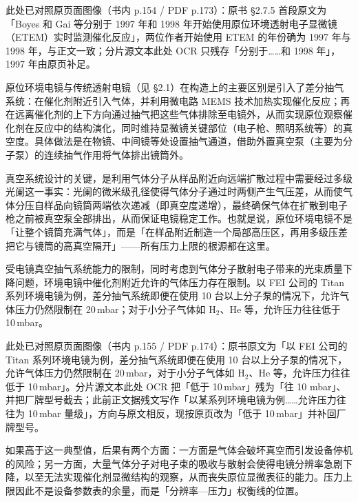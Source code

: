 此处已对照原页面图像（书内 p.154 / PDF p.173）：原书 \S 2.7.5 首段原文为「Boyes 和 Gai 等分别于 1997 年和 1998 年开始使用原位环境透射电子显微镜（ETEM）实时监测催化反应」，两位作者开始使用 ETEM 的年份确为 1997 年与 1998 年，与正文一致；分片源文本此处 OCR 只残存「分别于……和 1998 年」，1997 年由原页补足。

\begin{principle}
原位环境电镜与传统透射电镜（见 \S 2.1）在构造上的主要区别是引入了差分抽气系统：在催化剂附近引入气体，并利用微电路 MEMS 技术加热实现催化反应；再在远离催化剂的上下方向通过抽气把这些气体排除至电镜外，从而实现原位观察催化剂在反应中的结构演化，同时维持显微镜关键部位（电子枪、照明系统等）的真空度。具体做法是在物镜、中间镜等处设置抽气通道，借助外置真空泵（主要为分子泵）的连续抽气作用将气体排出镜筒外。

真空系统设计的关键，是利用气体分子从样品附近向远端扩散过程中需要经过多级光阑这一事实：光阑的微米级孔径使得气体分子通过时两侧产生气压差，从而使气体分压自样品向镜筒两端依次递减（即真空度递增），最终确保气体在扩散到电子枪之前被真空泵全部排出，从而保证电镜稳定工作。也就是说，原位环境电镜不是「让整个镜筒充满气体」，而是「在样品附近制造一个局部高压区，再用多级压差把它与镜筒的高真空隔开」——所有压力上限的根源都在这里。
\end{principle}

\begin{measure}
受电镜真空抽气系统能力的限制，同时考虑到气体分子散射电子带来的光束质量下降问题，环境电镜中催化剂附近允许的气体压力存在限制。以 FEI 公司的 Titan 系列环境电镜为例，差分抽气系统即便在使用 10 台以上分子泵的情况下，允许气体压力仍然限制在 20\,mbar；对于小分子气体如 H$_2$、He 等，允许压力往往低于 10\,mbar。

此处已对照原页面图像（书内 p.155 / PDF p.174）：原书原文为「以 FEI 公司的 Titan 系列环境电镜为例，差分抽气系统即便在使用 10 台以上分子泵的情况下，允许气体压力仍然限制在 20\,mbar，对于小分子气体如 H$_2$、He 等，允许压力往往低于 10\,mbar」。分片源文本此处 OCR 把「低于 10\,mbar」残为「往 10 mbar」、并把厂牌型号截去；此前正文据残文写作「以某系列环境电镜为例……允许压力往往为 10\,mbar 量级」，方向与原文相反，现按原页改为「低于 10\,mbar」并补回厂牌型号。

如果高于这一典型值，后果有两个方面：一方面是气体会破坏真空而引发设备停机的风险；另一方面，大量气体分子对电子束的吸收与散射会使得电镜分辨率急剧下降，以至无法实现催化剂显微结构的观察，从而丧失原位显微表征的能力。压力上限因此不是设备参数表的余量，而是「分辨率—压力」权衡线的位置。
\end{measure}

